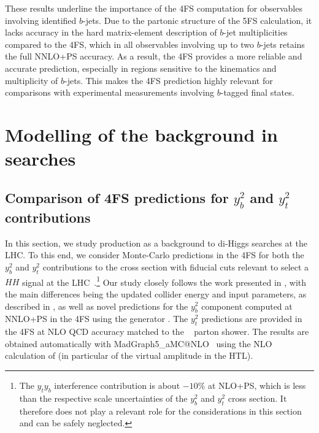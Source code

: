 \documentclass[11pt,a4paper]{article}
\begin{document}
These results underline the importance of the 4FS computation for observables involving identified $b$-jets. Due to the partonic structure of the 5FS calculation, it lacks accuracy in the hard matrix-element description of $b$-jet multiplicities compared to the 4FS, which in all observables involving up to two $b$-jets retains the full NNLO+PS accuracy. 
As a result, the 4FS provides a more reliable and accurate prediction, especially in regions sensitive to the kinematics and multiplicity of $b$-jets. This makes the 4FS prediction highly relevant for comparisons with experimental measurements involving $b$-tagged final states.


\section{Modelling of the  background in  searches}\label{sec:HH}

\subsection{Comparison of 4FS predictions for $y_b^2$ and $y_t^2$ contributions}
In this section, we study \bbH{} production as a background to di-Higgs searches at the LHC. To this end, we 
consider Monte-Carlo predictions in the 4FS for both the $y_b^2$ and  $y_t^2$ contributions to the \bbH{} cross section
with fiducial cuts relevant to select a $HH$ signal at the LHC~\cite{HDBS-2021-18,CMS-HIG-22-001}.\footnote{The $y_t y_b$ interference contribution is 
about $-10\%$ at NLO+PS, which is less than the respective scale uncertainties of the $y_b^2$ and  $y_t^2$ cross section. It therefore does not play a relevant
role for the considerations in this section and can be safely neglected.}
Our study closely follows the work presented in , with the main differences being the updated 
collider energy and input parameters, as described in , as well as novel predictions for the $y_b^2$ component
computed at NNLO+PS in the 4FS using the \minnlo{} generator \cite{Biello:2024pgo}. The $y_t^2$ predictions 
are provided in the 4FS at NLO QCD accuracy matched to the ~\cite{Bierlich:2022pfr} parton shower. 
The results are obtained automatically with {\sc MadGraph5\_aMC@NLO}~\cite{Alwall:2014hca,Frederix:2018nkq} using the NLO 
calculation of  (in particular of the virtual amplitude in the HTL).
\end{document}
